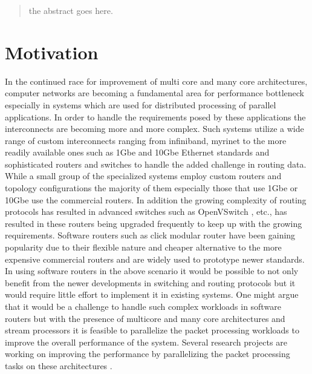 \documentclass[conference]{IEEEtran}
\begin{document}
\begin{abstract}
the abstract goes here.

\end{abstract}



%
\IEEEpeerreviewmaketitle

\section{Motivation}
In the continued race for improvement of multi core and many core architectures, computer networks are becoming a fundamental area for performance bottleneck especially in systems which are used for distributed processing of parallel applications. In order to handle the requirements posed by these applications the interconnects are becoming more and more complex. Such systems utilize a wide range of custom interconnects ranging from infiniband, myrinet to the more readily available ones such as 1Gbe and 10Gbe Ethernet standards and sophisticated routers and switches to handle the added challenge in routing data. While a small group of the specialized systems employ custom routers and topology configurations the majority of them especially those that use 1Gbe or 10Gbe use the commercial routers. In addition the growing complexity of routing protocols has resulted in advanced switches such as OpenVSwitch \cite{openvswitch}, etc., has resulted in these routers being upgraded frequently to keep up with the growing requirements. Software routers such as click modular router have been gaining popularity due to their flexible nature and cheaper alternative to the more expensive commercial routers and are widely used to prototype newer standards. In using software routers in the above scenario it would be possible to not only benefit from the newer developments in switching and routing protocols but it would require little effort to implement it in existing systems. One might argue that it would be a challenge to handle such complex workloads in software routers but with the presence of multicore and many core architectures and stream processors it is feasible to parallelize the packet processing workloads to improve the overall performance of the system. Several research projects are working on improving the performance by parallelizing the packet processing tasks on these architectures \cite{routebricks} \cite{packetshader}.
\end{document}
